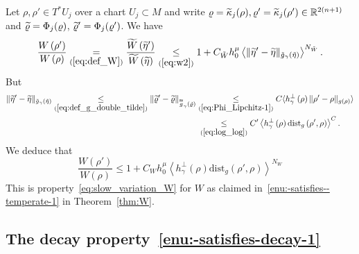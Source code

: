 \documentclass[AHL,Unicode,longabstracts,published]{cedram}
\newcommand*\eq[1]{\underset{(#1)}{=}}
\newcommand*\ineq[1]{\underset{(#1)}{\leq}}
\newcommand{\dist}{\mathrm{dist}}
\newcommand{\bbR}{\mathbb{R}}
\let\oldtilde\tilde
\renewcommand*{\tilde}[1]{\mathchoice{\widetilde{#1}}{\widetilde{#1}}{\oldtilde{#1}}{\oldtilde{#1}}}
\newcommand{\bbR}{\mathbb{R}}
\begin{document}
Let $\rho,\rho'\in T^{*}U_{j}$ over a chart $U_{j}\subset M$ and write $\varrho=\tilde{\kappa}_{j}(\rho),\varrho'=\tilde{\kappa}_{j}(\rho')\in\bbR^{2(n+1)}$ and $\tilde{\varrho}=\Phi_{j}(\varrho)$, $\tilde{\varrho}'=\Phi_{j}(\varrho')$. We have
\[
\frac{W\left(\rho'\right)}{W\left(\rho\right)}\eq{\ref{eq:def_W}}\frac{\tilde{W}\left(\tilde{\eta}'\right)}{\tilde{W}\left(\tilde{\eta}\right)}\ineq{\ref{eq:w2}}1+C_{\tilde{W}}h_{0}^{\mu}\left\langle\|\tilde{\eta}'-\tilde{\eta}\|_{\tilde{g}_{\gamma}\left(\tilde{\eta}\right)}\right\rangle^{N_{\tilde{W}}}.
\]
But
\begin{align*}
\|\tilde{\eta}'-\tilde{\eta}\|_{\tilde{g}_{\gamma}\left(\tilde{\eta}\right)}\ineq{\ref{eq:def_g_double_tilde}}\|\tilde{\varrho}'-\tilde{\varrho}\|_{\overset{\thickapprox}{g}_{\gamma}\left(\tilde{\varrho}\right)}&\ineq{\ref{eq:Phi_Lipchitz-1}}C\langle h_{\gamma}^{\perp}\left(\rho\right)\|\rho'-\rho\|_{g\left(\rho\right)}\rangle \\
& \:\ineq{\ref{eq:log_log}}C'\left\langle h_{\gamma}^{\perp}\left(\rho\right)\dist_{g}\left(\rho',\rho\right)\right\rangle ^{C}.
\end{align*}
We deduce that
\[
\frac{W\left(\rho'\right)}{W\left(\rho\right)}\leq1+C_{W}h_{0}^{\mu}\left\langle h_{\gamma}^{\perp}\left(\rho\right)\dist_{g}\left(\rho',\rho\right)\right\rangle ^{N_{W}}
\]
This is property~\eqref{eq:slow_variation_W} for $W$ as claimed in~\eqref{enu:-satisfies--temperate-1} in Theorem~\ref{thm:W}.

\subsection{The decay property~\eqref{enu:-satisfies-decay-1}}
\end{document}
